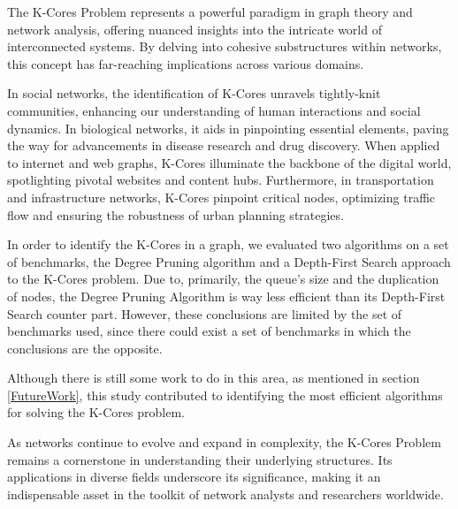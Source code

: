 \label{Conclusion}

The K-Cores Problem represents a powerful paradigm in graph theory and network analysis, offering nuanced insights into the intricate world of interconnected systems. By delving into cohesive substructures within networks, this concept has far-reaching implications across various domains.

In social networks, the identification of K-Cores unravels tightly-knit communities, enhancing our understanding of human interactions and social dynamics. In biological networks, it aids in pinpointing essential elements, paving the way for advancements in disease research and drug discovery. When applied to internet and web graphs, K-Cores illuminate the backbone of the digital world, spotlighting pivotal websites and content hubs. Furthermore, in transportation and infrastructure networks, K-Cores pinpoint critical nodes, optimizing traffic flow and ensuring the robustness of urban planning strategies.

In order to identify the K-Cores in a graph, we evaluated two algorithms on a set of benchmarks, the Degree Pruning algorithm and a Depth-First Search approach to the K-Cores problem. Due to, primarily, the queue's size and the duplication of nodes, the Degree Pruning Algorithm is way less efficient than its Depth-First Search counter part. However, these conclusions are limited by the set of benchmarks used, since there could exist a set of benchmarks in which the conclusions are the opposite.

Although there is still some work to do in this area, as mentioned in section \ref{FutureWork}, this study contributed to identifying the most efficient algorithms for solving the K-Cores problem.

As networks continue to evolve and expand in complexity, the K-Cores Problem remains a cornerstone in understanding their underlying structures. Its applications in diverse fields underscore its significance, making it an indispensable asset in the toolkit of network analysts and researchers worldwide.
